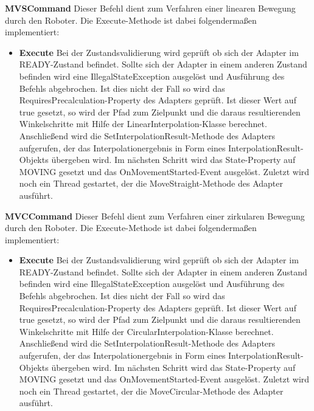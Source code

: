 \textbf{MVSCommand}
\newline
Dieser Befehl dient zum Verfahren einer linearen Bewegung durch den Roboter. Die Execute-Methode ist dabei folgendermaßen implementiert:
\begin{itemize}
\item \textbf{Execute}
\newline
Bei der Zustandsvalidierung wird geprüft ob sich der Adapter im READY-Zustand befindet. Sollte sich der Adapter in einem anderen Zustand befinden wird eine IllegalStateException ausgelöst und Ausführung des Befehls abgebrochen. Ist dies nicht der Fall so wird das RequiresPrecalculation-Property des Adapters geprüft. Ist dieser Wert auf true gesetzt, so wird der Pfad zum Zielpunkt und die daraus resultierenden Winkelschritte mit Hilfe der LinearInterpolation-Klasse berechnet. Anschließend wird die SetInterpolationResult-Methode des Adapters aufgerufen, der das Interpolationergebnis in Form eines InterpolationResult-Objekts übergeben wird. Im nächsten Schritt wird das State-Property auf MOVING gesetzt und das OnMovementStarted-Event ausgelöst. Zuletzt wird noch ein Thread gestartet, der die MoveStraight-Methode des Adapter ausführt.
\end{itemize}

\textbf{MVCCommand}
\newline
Dieser Befehl dient zum Verfahren einer zirkularen Bewegung durch den Roboter. Die Execute-Methode ist dabei folgendermaßen implementiert:
\begin{itemize}
\item \textbf{Execute}
\newline
Bei der Zustandsvalidierung wird geprüft ob sich der Adapter im READY-Zustand befindet. Sollte sich der Adapter in einem anderen Zustand befinden wird eine IllegalStateException ausgelöst und Ausführung des Befehls abgebrochen. Ist dies nicht der Fall so wird das RequiresPrecalculation-Property des Adapters geprüft. Ist dieser Wert auf true gesetzt, so wird der Pfad zum Zielpunkt und die daraus resultierenden Winkelschritte mit Hilfe der CircularInterpolation-Klasse berechnet. Anschließend wird die SetInterpolationResult-Methode des Adapters aufgerufen, der das Interpolationergebnis in Form eines InterpolationResult-Objekts übergeben wird. Im nächsten Schritt wird das State-Property auf MOVING gesetzt und das OnMovementStarted-Event ausgelöst. Zuletzt wird noch ein Thread gestartet, der die MoveCircular-Methode des Adapter ausführt.
\end{itemize}

